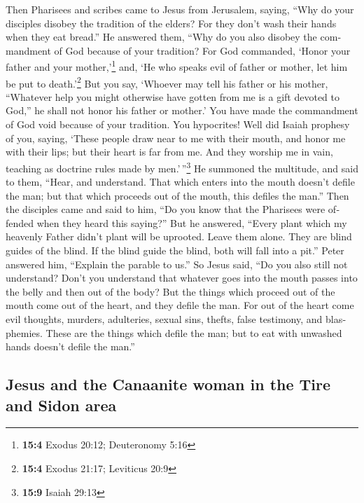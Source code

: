 \begin{paracol}{2}
\begin{otherlanguage}{english}
 Then Pharisees and scribes came to Jesus from Jerusalem,
saying,  ``Why do your disciples disobey the tradition of
the elders? For they don't wash their hands when they eat bread.''
 He answered them, ``Why do you also disobey the
commandment of God because of your tradition?  For God
commanded, `Honor your father and your mother,'\footnote{\textbf{15:4}
  Exodus 20:12; Deuteronomy 5:16} and, `He who speaks evil of father or
mother, let him be put to death.'\footnote{\textbf{15:4} Exodus 21:17;
  Leviticus 20:9}  But you say, `Whoever may tell his
father or his mother, ``Whatever help you might otherwise have gotten
from me is a gift devoted to God,''  he shall not honor
his father or mother.' You have made the commandment of God void because
of your tradition.  You hypocrites! Well did Isaiah
prophesy of you, saying,  `These people draw near to me
with their mouth, and honor me with their lips; but their heart is far
from me.  And they worship me in vain, teaching as
doctrine rules made by men.'\,''\footnote{\textbf{15:9} Isaiah 29:13}
 He summoned the multitude, and said to them, ``Hear, and
understand.  That which enters into the mouth doesn't
defile the man; but that which proceeds out of the mouth, this defiles
the man.''  Then the disciples came and said to him, ``Do
you know that the Pharisees were offended when they heard this saying?''
 But he answered, ``Every plant which my heavenly Father
didn't plant will be uprooted.  Leave them alone. They
are blind guides of the blind. If the blind guide the blind, both will
fall into a pit.''  Peter answered him, ``Explain the
parable to us.''  So Jesus said, ``Do you also still not
understand?  Don't you understand that whatever goes into
the mouth passes into the belly and then out of the body?
 But the things which proceed out of the mouth come out
of the heart, and they defile the man.  For out of the
heart come evil thoughts, murders, adulteries, sexual sins, thefts,
false testimony, and blasphemies.  These are the things
which defile the man; but to eat with unwashed hands doesn't defile the
man.''

\hypertarget{jesus-and-the-canaanite-woman-in-the-tire-and-sidon-area}{%
\subsection{Jesus and the Canaanite woman in the Tire and Sidon
area}\label{jesus-and-the-canaanite-woman-in-the-tire-and-sidon-area}}


\end{otherlanguage}
\end{paracol}
